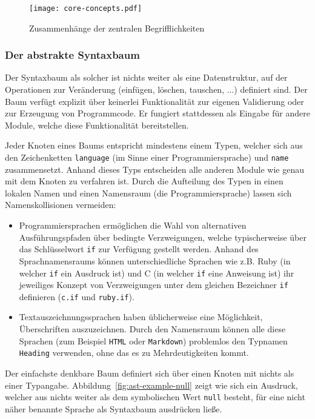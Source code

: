 \documentclass[paper=a4,fontsize=11pt,parskip=half]{scrartcl}
\begin{document}
\begin{figure}[h]
  \texttt{[image: core-concepts.pdf]}
  \caption{Zusammenhänge der zentralen Begrifflichkeiten}
  \label{fig:core-relations}
\end{figure}

\subsubsection{Der abstrakte Syntaxbaum}

Der Syntaxbaum als solcher ist nichts weiter als eine Datenstruktur, auf der Operationen zur Veränderung (einfügen, löschen, tauschen, ...) definiert sind. Der Baum verfügt explizit über keinerlei Funktionalität zur eigenen Validierung oder zur Erzeugung von Programmcode. Er fungiert stattdessen als Eingabe für andere Module, welche diese Funktionalität bereitstellen.

Jeder Knoten eines Baums entspricht mindestens einem Typen, welcher sich aus den Zeichenketten \texttt{language} (im Sinne einer Programmiersprache) und \texttt{name} zusammensetzt. Anhand dieses Typs entscheiden alle anderen Module wie genau mit dem Knoten zu verfahren ist. Durch die Aufteilung des Typen in einen lokalen Namen und einen Namensraum (die Programmiersprache) lassen sich Namenskollisionen vermeiden:

\begin{itemize}
\item Programmiersprachen ermöglichen die Wahl von alternativen Ausführungspfaden  über bedingte Verzweigungen, welche typischerweise über das Schlüsselwort \texttt{if} zur Verfügung gestellt werden. Anhand des Sprachnamensraums können unterschiedliche Sprachen wie z.B. Ruby (in welcher \texttt{if} ein Ausdruck ist) und C (in welcher \texttt{if} eine Anweisung ist) ihr jeweiliges Konzept von Verzweigungen unter dem gleichen Bezeichner \texttt{if} definieren (\texttt{c.if} und \texttt{ruby.if}).
\item Textauszeichnungssprachen haben üblicherweise eine Möglichkeit, Überschriften auszuzeichnen. Durch den Namensraum können alle diese Sprachen (zum Beispiel \texttt{HTML} oder \texttt{Markdown}) problemlos den Typnamen \texttt{Heading} verwenden, ohne das es zu Mehrdeutigkeiten kommt.
\end{itemize}

Der einfachste denkbare Baum definiert sich über einen Knoten mit nichts als einer Typangabe. Abbildung~\ref{fig:ast-example-null} zeigt wie sich ein Ausdruck, welcher aus nichts weiter als dem symbolischen Wert \texttt{null} besteht, für eine nicht näher benannte Sprache als Syntaxbaum ausdrücken ließe.
\end{document}
